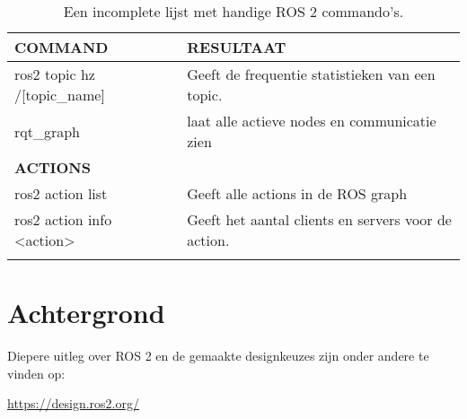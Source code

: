 \begin{table}[h]
\centering
{}
\setlength{\arrayrulewidth}{0.5mm}
\setlength{\tabcolsep}{9pt}
\renewcommand{\arraystretch}{1.5}

\begin{tabular}{|l|l|}
\hline
\textbf{COMMAND}               & \textbf{RESULTAAT}                                \\ \hline
ros2 topic hz /[topic\_name]    & Geeft de frequentie statistieken van een topic.                                         \\ \hline
rqt\_graph                       & laat alle actieve nodes en communicatie zien      \\ \hline
\multicolumn{2}{|l|}{\textbf{ACTIONS}}                                                \\ \hline
ros2 action list                & Geeft alle actions in de ROS graph                \\ \hline
ros2 action info <action>       & Geeft het aantal clients en servers voor de action.\\ \hline
          &                     \\ \hline
\end{tabular}
\caption{Een incomplete lijst met handige ROS 2 commando's.}
\label{table:ROS_commandos}
\end{table}

\section{Achtergrond}
Diepere uitleg over ROS 2 en de gemaakte designkeuzes zijn onder andere te vinden op: \\
\begin{center}
    \url{https://design.ros2.org/}
\end{center}

